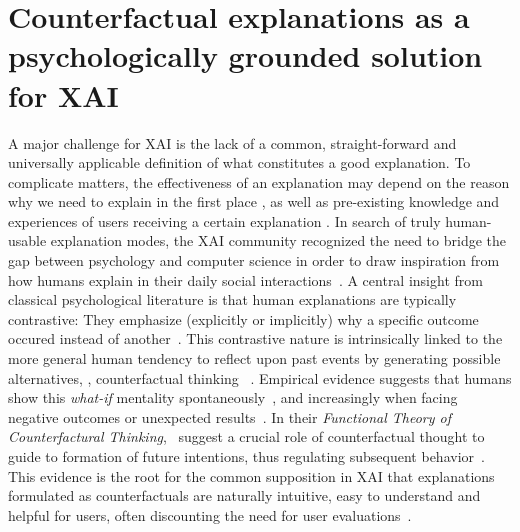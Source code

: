 \section{Counterfactual explanations as a psychologically grounded solution for XAI}\label{subsec:psychoCFs}

\textcolor{ACMDarkBlue}{
A major challenge for \gls{XAI} is the lack of a common, straight-forward and universally applicable definition of what constitutes a good explanation. To complicate matters, the effectiveness of an explanation may depend on the reason why we need to explain in the first place \citep{adadi_peeking_2018}, as well as pre-existing knowledge and experiences of users receiving a certain explanation \citep{van_der_waa_evaluating_2021}.
In search of truly human-usable explanation modes, the \gls{XAI} community recognized the need to bridge the gap between psychology and computer science in order to draw inspiration from how humans explain in their daily social interactions~\citep{miller_explanation_2019}.
A central insight from classical psychological literature is that human explanations are typically contrastive: They emphasize (explicitly or implicitly) why a specific outcome occured instead of another~\citep{miller_explanation_2019, lipton_contrastive_1990, lombrozo_explanation_2012, hilton_knowledge-based_1986}.
This contrastive nature is intrinsically linked to the more general human tendency to reflect upon past events by generating possible alternatives, \ie, counterfactual thinking ~\citep{roese_counterfactual_1997}.
Empirical evidence suggests that humans show this \textit{what-if} mentality spontaneously~\citep{goldinger_blaming_2003}, and increasingly when facing negative outcomes or unexpected results~\citep{sanna_antecedents_1996}.
In their \textit{Functional Theory of Counterfactural Thinking},~\citeauthor{roese_functional_2017} suggest a crucial role of counterfactual thought to guide to formation of future intentions, thus regulating subsequent behavior~\citep{roese_functional_2017,epstude_functional_2008}.
This evidence is the root for the common supposition in \gls{XAI} that explanations formulated as counterfactuals are naturally intuitive, easy to understand and helpful for users, often discounting the need for user evaluations~\citep{stepin_paving_2019, dandl_multi-objective_2020, guidotti_local_2018, artelt_counterfactual_2020, artelt_efficient_2022}.
}


